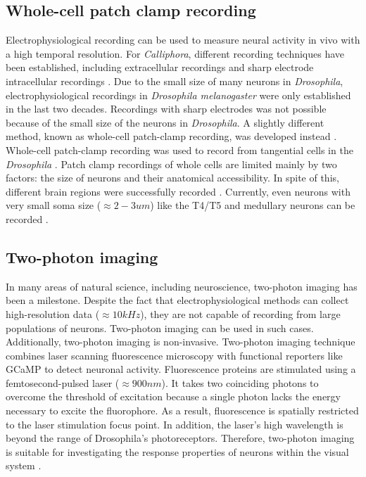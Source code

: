 \subsection{Whole-cell patch clamp recording}
Electrophysiological recording can be used to measure neural activity in vivo with a high temporal resolution. For \textit{Calliphora}, different recording techniques have been established, including extracellular recordings and sharp electrode intracellular recordings \parencite{Haag2001, Laughlin1989, Bishop1967}. Due to the small size of many neurons in \textit{Drosophila}, electrophysiological recordings in \textit{Drosophila melanogaster} were only established in the last two decades. Recordings with sharp electrodes was not possible because of the small size of the neurons in \textit{Drosophila}. A slightly different method, known as whole-cell patch-clamp recording, was developed instead \parencite{Sakmann1984}. Whole-cell patch-clamp recording was used to record from tangential cells in the \textit{Drosophila} \parencite{ Joesch2008}. Patch clamp recordings of whole cells are limited mainly by two factors: the size of neurons and their anatomical accessibility. In spite of this, different brain regions were successfully recorded \parencite{Behnia2014, Murthy2008, Wilson2004}. Currently, even neurons with very small soma size ($\approx 2-3um$) like the T4/T5 and medullary neurons can be recorded \parencite{Gruntman2018, Groschner2022}.

\subsection{Two-photon imaging}
In many areas of natural science, including neuroscience, two-photon imaging \parencite{Denk1990} has been a milestone. Despite the fact that electrophysiological methods can collect high-resolution data ($\approx 10kHz$), they are not capable of recording from large populations of neurons. Two-photon imaging can be used in such cases. Additionally, two-photon imaging is non-invasive. Two-photon imaging technique combines laser scanning fluorescence microscopy with functional reporters like GCaMP to detect neuronal activity. Fluorescence proteins are stimulated using a femtosecond-pulsed laser ($\approx 900nm$). It takes two coinciding photons to overcome the threshold of excitation because a single photon lacks the energy necessary to excite the fluorophore. As a result, fluorescence is spatially restricted to the laser stimulation focus point. In addition, the laser's high wavelength is beyond the range of Drosophila's photoreceptors. Therefore, two-photon imaging is suitable for investigating the response properties of neurons within the visual system \parencite{Maisak2013, Reiff2010, Strother2018}.

